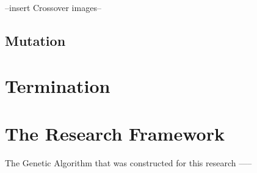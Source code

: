 --insert Crossover images--

\subsection{Mutation}
\par
\section{Termination}
\par
\section{The Research Framework}
\par
The Genetic Algorithm that was constructed for this research -----

